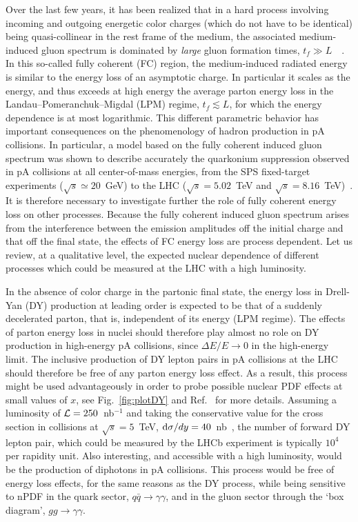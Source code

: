 \documentclass[../report.tex]{subfiles}
\begin{document}
Over the last few years, it has been realized that in a hard process involving incoming and outgoing energetic color charges (which do not have to be identical) being quasi-collinear in the rest frame of the medium, the associated medium-induced gluon spectrum is dominated by {\it large} gluon formation times, $t_f \gg L$~~\cite{Arleo:2010rb,Peigne:2014rka,Peigne:2014uha}. In this so-called fully coherent (FC) region, the medium-induced radiated energy is similar to the energy loss of an asymptotic charge. In particular it scales as the energy, and thus exceeds at high energy the average parton energy loss in the Landau--Pomeranchuk--Migdal (LPM) regime, $t_f \lesssim L$, for which the energy dependence is at most logarithmic.
%
This different parametric behavior has important consequences on the phenomenology of hadron production in pA collisions. In particular, a model based on the fully coherent induced gluon spectrum was shown to describe accurately the quarkonium suppression observed in pA collisions at all center-of-mass energies, from the SPS fixed-target experiments ($\sqrt{s}\simeq 20$~GeV) to the LHC ($\sqrt{s}=5.02$~TeV and $\sqrt{s}=8.16$~TeV)~\cite{Arleo:2012hn,Arleo:2012rs,Arleo:2013zua}. It is therefore necessary to investigate further the role of fully coherent energy loss on other processes.
%
Because the fully coherent induced gluon spectrum arises from the interference between the emission amplitudes off the initial charge and that off the final state, the effects of FC energy loss are process dependent. Let us review, at a qualitative level, the expected nuclear dependence of different processes which could be measured at the LHC with a high luminosity.

In the absence of color charge in the partonic final state, the energy loss in Drell-Yan (DY) production at leading order is expected to be that of a suddenly decelerated parton, that is, independent of its energy (LPM regime). The effects of parton energy loss in nuclei should therefore play almost no role on DY production in high-energy pA collisions, since $\Delta E / E \to 0$ in the high-energy limit. The inclusive production of DY lepton pairs in pA collisions at the LHC should therefore be free of any parton energy loss effect. As a result, this process might be used advantageously in order to probe possible nuclear PDF effects at small values of $x$, see \eg Fig.~\ref{fig:plotDY} and Ref.~\cite{Arleo:2015qiv} for more details. Assuming a luminosity of ${\cal L}=250$~nb$^{-1}$ and taking the conservative value for the cross section in \pPb collisions at $\sqrt{s}=5$~TeV, ${\rm d}\sigma/dy=40$~nb~\cite{Arleo:2015qiv}, the number of forward DY lepton pair, which could be measured by the LHCb experiment is typically $10^4$ per rapidity unit. Also interesting, and accessible with a high luminosity, would be the production of diphotons in pA collisions. This process would be free of energy loss effects, for the same reasons as the DY process, while being sensitive to nPDF in the quark sector, $q\bar{q} \to \gamma\gamma$, and in the gluon sector through the `box diagram', $gg \to \gamma\gamma$.
\end{document}
